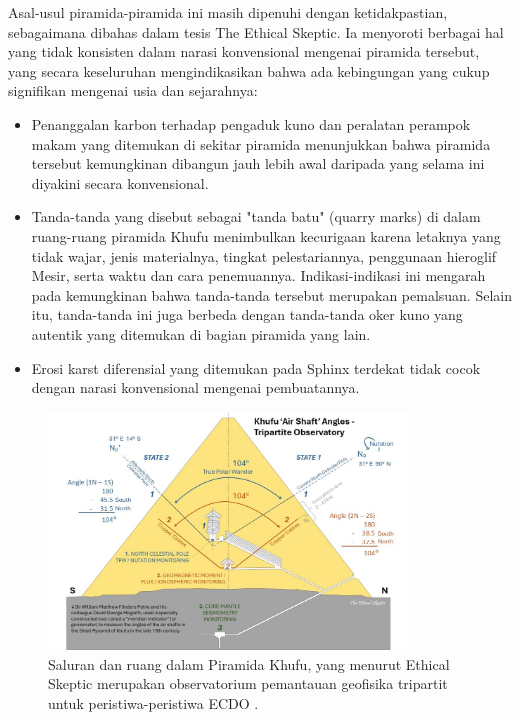 \documentclass[10pt,twocolumn,letterpaper]{article}
\begin{document}
Asal-usul piramida-piramida ini masih dipenuhi dengan ketidakpastian, sebagaimana dibahas dalam tesis The Ethical Skeptic. Ia menyoroti berbagai hal yang tidak konsisten dalam narasi konvensional mengenai piramida tersebut, yang secara keseluruhan mengindikasikan bahwa ada kebingungan yang cukup signifikan mengenai usia dan sejarahnya:

\begin{flushleft}
\begin{itemize}
    \item Penanggalan karbon terhadap pengaduk kuno dan peralatan perampok makam yang ditemukan di sekitar piramida menunjukkan bahwa piramida tersebut kemungkinan dibangun jauh lebih awal daripada yang selama ini diyakini secara konvensional.
    \item Tanda-tanda yang disebut sebagai "tanda batu" (quarry marks) di dalam ruang-ruang piramida Khufu menimbulkan kecurigaan karena letaknya yang tidak wajar, jenis materialnya, tingkat pelestariannya, penggunaan hieroglif Mesir, serta waktu dan cara penemuannya. Indikasi-indikasi ini mengarah pada kemungkinan bahwa tanda-tanda tersebut merupakan pemalsuan. Selain itu, tanda-tanda ini juga berbeda dengan tanda-tanda oker kuno yang autentik yang ditemukan di bagian piramida yang lain.
    \item Erosi karst diferensial yang ditemukan pada Sphinx terdekat tidak cocok dengan narasi konvensional mengenai pembuatannya.
\end{itemize}
\end{flushleft}

\begin{figure}[b]
\begin{center}
\includegraphics[width=0.85\textwidth]{shafts.jpg}
\end{center}
   \caption{Saluran dan ruang dalam Piramida Khufu, yang menurut Ethical Skeptic merupakan observatorium pemantauan geofisika tripartit untuk peristiwa-peristiwa ECDO \cite{28}.}
\label{fig:5}
\end{figure}
\end{document}
